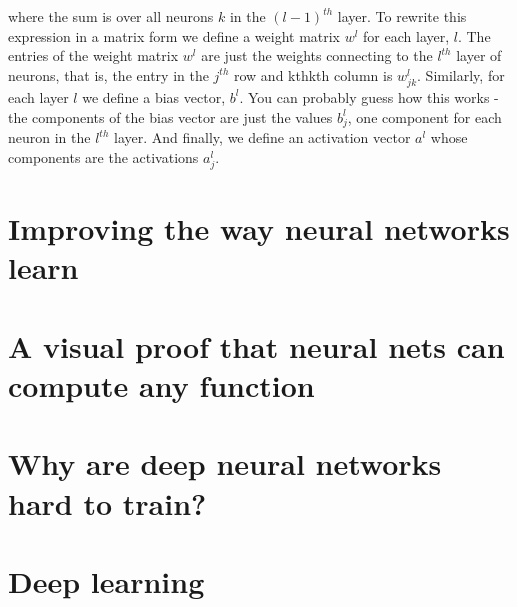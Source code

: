 \documentclass[a4paper,12pt]{report}%
\begin{document}
where the sum is over all neurons $k$ in the $(l−1)^{th}$ layer. To rewrite this expression in a matrix form we define a weight matrix $w^{l}$ for each layer, $l$. The entries of the weight matrix $w^{l}$ are just the weights connecting to the $l^{th}$ layer of neurons, that is, the entry in the $j^{th}$ row and kthkth column is $w^{l}_{jk}$. Similarly, for each layer $l$ we define a bias vector, $b^{l}$. You can probably guess how this works - the components of the bias vector are just the values $b^{l}_{j}$, one component for each neuron in the $l^{th}$ layer. And finally, we define an activation vector $a^{l}$ whose components are the activations $a^{l}_{j}$.
%



\chapter{\color{IAF} \bf Improving the way neural networks learn}




\chapter{\color{IAF} \bf A visual proof that neural nets can compute any function}



\chapter{\color{IAF} \bf Why are deep neural networks hard to train?}



\chapter{\color{IAF} \bf Deep learning}



\newpage
\end{document}
